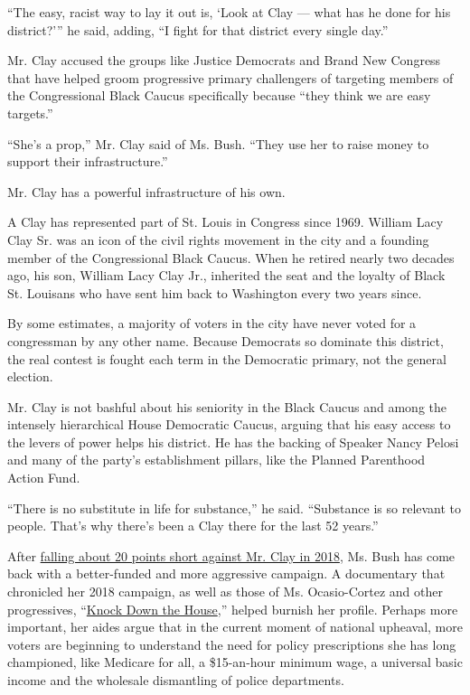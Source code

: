 ``The easy, racist way to lay it out is, `Look at Clay --- what has he
done for his district?''' he said, adding, ``I fight for that district
every single day.''

Mr. Clay accused the groups like Justice Democrats and Brand New
Congress that have helped groom progressive primary challengers of
targeting members of the Congressional Black Caucus specifically because
``they think we are easy targets.''

``She's a prop,'' Mr. Clay said of Ms. Bush. ``They use her to raise
money to support their infrastructure.''

Mr. Clay has a powerful infrastructure of his own.

A Clay has represented part of St. Louis in Congress since 1969. William
Lacy Clay Sr. was an icon of the civil rights movement in the city and a
founding member of the Congressional Black Caucus. When he retired
nearly two decades ago, his son, William Lacy Clay Jr., inherited the
seat and the loyalty of Black St. Louisans who have sent him back to
Washington every two years since.

By some estimates, a majority of voters in the city have never voted for
a congressman by any other name. Because Democrats so dominate this
district, the real contest is fought each term in the Democratic
primary, not the general election.

Mr. Clay is not bashful about his seniority in the Black Caucus and
among the intensely hierarchical House Democratic Caucus, arguing that
his easy access to the levers of power helps his district. He has the
backing of Speaker Nancy Pelosi and many of the party's establishment
pillars, like the Planned Parenthood Action Fund.

``There is no substitute in life for substance,'' he said. ``Substance
is so relevant to people. That's why there's been a Clay there for the
last 52 years.''

After
\href{https://www.nytimes.com/elections/results/missouri-house-district-1-primary-election}{falling
about 20 points short against Mr. Clay in 2018}, Ms. Bush has come back
with a better-funded and more aggressive campaign. A documentary that
chronicled her 2018 campaign, as well as those of Ms. Ocasio-Cortez and
other progressives,
``\href{https://www.nytimes.com/2019/04/30/movies/knock-down-the-house-review.html}{Knock
Down the House},'' helped burnish her profile. Perhaps more important,
her aides argue that in the current moment of national upheaval, more
voters are beginning to understand the need for policy prescriptions she
has long championed, like Medicare for all, a \$15-an-hour minimum wage,
a universal basic income and the wholesale dismantling of police
departments.

